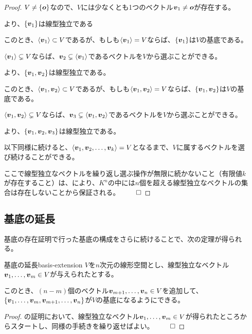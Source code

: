 \documentclass[../../../topic_linear-algebra]{subfiles}
\begin{document}
\begin{proof}
  $V \neq  \{\vb*{o} \}$なので、$V$には少なくとも1つのベクトル$\vb*{v}_1 \neq \vb*{o}$が存在する。

  より、$\{\vb*{v}_1 \}$は線型独立である

  \br

  このとき、$\langle \vb*{v}_1 \rangle \subset V$であるが、もしも$\langle \vb*{v}_1 \rangle = V$ならば、$\{\vb*{v}_1 \}$は$V$の基底である。

  \br

  $\langle \vb*{v}_1 \rangle \subsetneq V$ならば、$\vb*{v}_2 \subsetneq \langle \vb*{v}_1 \rangle$であるベクトルを$V$から選ぶことができる。

  より、$\{\vb*{v}_1, \vb*{v}_2 \}$は線型独立である。

  \br

  このとき、$\langle \vb*{v}_1, \vb*{v}_2 \rangle \subset V$であるが、もしも$\langle \vb*{v}_1, \vb*{v}_2 \rangle = V$ならば、$\{\vb*{v}_1, \vb*{v}_2 \}$は$V$の基底である。

  \br

  $\langle \vb*{v}_1, \vb*{v}_2 \rangle \subsetneq V$ならば、$\vb*{v}_3 \subsetneq \langle \vb*{v}_1, \vb*{v}_2 \rangle$であるベクトルを$V$から選ぶことができる。

  より、$\{\vb*{v}_1, \vb*{v}_2, \vb*{v}_3 \}$は線型独立である。

  \br

  以下同様に続けると、$\langle \vb*{v}_1, \vb*{v}_2, \dots, \vb*{v}_k \rangle = V$となるまで、$V$に属するベクトルを選び続けることができる。

  \br

  ここで線型独立なベクトルを繰り返し選ぶ操作が無限に続かないこと（有限値$k$が存在すること）は、により、$K^n$の中には$n$個を超える線型独立なベクトルの集合は存在しないことから保証される。 $\qed$
\end{proof}

\subsection{基底の延長}

基底の存在証明で行った基底の構成をさらに続けることで、次の定理が得られる。

\begin{theorem}{基底の延長}{basis-extension}
  $V$を$n$次元の線形空間とし、線型独立なベクトル$\vb*{v}_1, \dots, \vb*{v}_m \in V$が与えられたとする。

  このとき、$(n-m)$個のベクトル$\vb*{v}_{m+1}, \dots, \vb*{v}_n \in V$を追加して、$\{ \vb*{v}_1, \dots, \vb*{v}_m, \vb*{v}_{m+1}, \dots, \vb*{v}_n \}$が$V$の基底になるようにできる。
\end{theorem}

\begin{proof}
  の証明において、線型独立なベクトル$\vb*{v}_1, \dots, \vb*{v}_m \in V$が得られたところからスタートし、同様の手続きを繰り返せばよい。 $\qed$
\end{proof}
\end{document}
